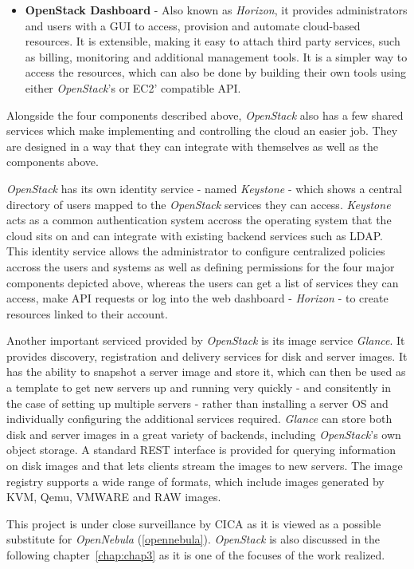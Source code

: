 \begin{itemize}
\item \textbf{OpenStack Dashboard} - Also known as \textit{Horizon}, it provides administrators and users with a GUI to access, provision and automate cloud-based resources. It is extensible, making it easy to attach third party services, such as billing, monitoring and additional management tools. It is a simpler way to access the resources, which can also be done by building their own tools using either \textit{OpenStack}'s or EC2' compatible API.
\end{itemize}

Alongside the four components described above, \textit{OpenStack} also has a few shared services which make implementing and controlling the cloud an easier job. They are designed in a way that they can integrate with themselves as well as the components above.

\textit{OpenStack} has its own identity service - named \textit{Keystone} - which shows a central directory of users mapped to the \textit{OpenStack} services they can access. \textit{Keystone} acts as a common authentication system accross the operating system that the cloud sits on and can integrate with existing backend services such as LDAP. This identity service allows the administrator to configure centralized policies accross the users and systems as well as defining permissions for the four major components depicted above, whereas the users can get a list of services they can access, make API requests or log into the web dashboard - \textit{Horizon} - to create resources linked to their account.

Another important serviced provided by \textit{OpenStack} is its image service \textit{Glance}. It provides discovery, registration and delivery services for disk and server images. It has the ability to snapshot a server image and store it, which can then be used as a template to get new servers up and running very quickly - and consitently in the case of setting up multiple servers - rather than installing a server OS and individually configuring the additional services required. \textit{Glance} can store both disk and server images in a great variety of backends, including \textit{OpenStack}'s own object storage. A standard REST interface is provided for querying information on disk images and that lets clients stream the images to new servers. The image registry supports a wide range of formats, which include images generated by KVM, Qemu, VMWARE and RAW images.

This project is under close surveillance by CICA as it is viewed as a possible substitute for \textit{OpenNebula} (\ref{opennebula}). \textit{OpenStack} is also discussed in the following chapter~\ref{chap:chap3} as it is one of the focuses of the work realized.

